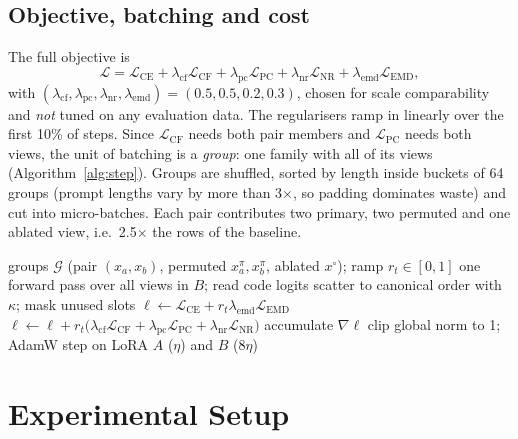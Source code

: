 \documentclass[conference]{IEEEtran}
\newcommand{\Lce}{\mathcal{L}_{\mathrm{CE}}}
\newcommand{\Lcf}{\mathcal{L}_{\mathrm{CF}}}
\newcommand{\Lpc}{\mathcal{L}_{\mathrm{PC}}}
\newcommand{\Lnr}{\mathcal{L}_{\mathrm{NR}}}
\newcommand{\Lemd}{\mathcal{L}_{\mathrm{EMD}}}
\begin{document}
\subsection{Objective, batching and cost}
\label{sec:optim}
The full objective is
\begin{equation}
\mathcal{L}=\Lce+\lambda_{\mathrm{cf}}\Lcf+\lambda_{\mathrm{pc}}\Lpc
+\lambda_{\mathrm{nr}}\Lnr+\lambda_{\mathrm{emd}}\Lemd ,
\label{eq:objective}
\end{equation}
with $(\lambda_{\mathrm{cf}},\lambda_{\mathrm{pc}},\lambda_{\mathrm{nr}},\lambda_{\mathrm{emd}})=(0.5,0.5,0.2,0.3)$,
chosen for scale comparability and \emph{not} tuned on any evaluation data. The
regularisers ramp in linearly over the first 10\% of steps. Since
$\Lcf$ needs both pair members and $\Lpc$ needs both views, the unit of
batching is a \emph{group}: one family with all of its views
(Algorithm~\ref{alg:step}). Groups are shuffled, sorted by length inside
buckets of 64 groups (prompt lengths vary by more than 3$\times$, so padding
dominates waste) and cut into micro-batches. Each pair contributes two primary, two permuted
and one ablated view, i.e.\ 2.5$\times$ the rows of the baseline.

\begin{algorithm}[t]
\caption{One PACT optimiser step}
\label{alg:step}
\small
\begin{algorithmic}[1]
\Require groups $\mathcal{G}$ (pair $(x_a,x_b)$, permuted $x_a^{\pi},x_b^{\pi}$, ablated $x^\circ$); ramp $r_t\in[0,1]$
  \State one forward pass over all views in $B$; read code logits
  \State scatter to canonical order with $\kappa$; mask unused slots
  \State $\ell\gets\Lce+r_t\lambda_{\mathrm{emd}}\Lemd$ 
  \State $\ell\gets\ell+r_t\big(\lambda_{\mathrm{cf}}\Lcf+\lambda_{\mathrm{pc}}\Lpc+\lambda_{\mathrm{nr}}\Lnr\big)$
  \State accumulate $\nabla\ell$
\EndFor
\State clip global norm to 1; AdamW step on LoRA $A$ ($\eta$) and $B$ ($8\eta$)
\end{algorithmic}
\end{algorithm}

\section{Experimental Setup}
\label{sec:setup}
\end{document}
